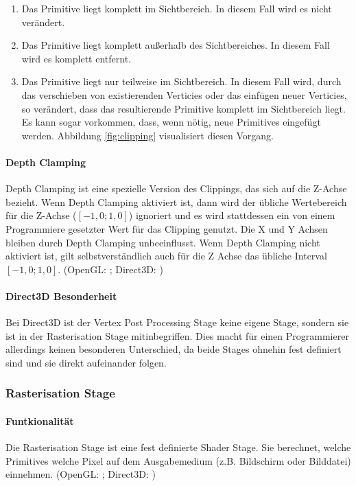 \begin{enumerate}
    \item Das Primitive liegt komplett im Sichtbereich. In diesem Fall wird es nicht verändert.
    \item Das Primitive liegt komplett außerhalb des Sichtbereiches. In diesem Fall wird es komplett entfernt.
    \item Das Primitive liegt nur teilweise im Sichtbereich. In diesem Fall wird, durch das verschieben von existierenden Verticies oder das einfügen neuer Verticies, so verändert, dass das resultierende Primitive komplett im Sichtbereich liegt. Es kann sogar vorkommen, dass, wenn nötig, neue Primitives eingefügt werden. Abbildung \ref{fig:clipping} visualisiert diesen Vorgang.
\end{enumerate}

\paragraph{Depth Clamping}
Depth Clamping ist eine spezielle Version des Clippings, das sich auf die Z-Achse bezieht. Wenn Depth Clamping aktiviert ist, dann wird der übliche Wertebereich für die Z-Achse ($[-1,0;1,0]$) ignoriert und es wird stattdessen ein von einem Programmiere gesetzter Wert für das Clipping genutzt. Die X und Y Achsen bleiben durch Depth Clamping unbeeinflusst. Wenn Depth Clamping nicht aktiviert ist, gilt selbstverständlich auch für die Z Achse das übliche Interval $[-1,0;1,0]$. (OpenGL: \cite{stage_gl_vertex_pp}; Direct3D: \cite{stage_d3d_vertex_pp})

\paragraph{Direct3D Besonderheit}
Bei Direct3D ist der Vertex Post Processing Stage keine eigene Stage, sondern sie ist in der Rasterisation Stage mitinbegriffen. Dies macht für einen Programmierer allerdings keinen besonderen Unterschied, da beide Stages ohnehin fest definiert sind und sie direkt aufeinander folgen.

\subsubsection{Rasterisation Stage}
\paragraph{Funtkionalität}
Die Rasterisation Stage ist eine fest definierte Shader Stage. Sie berechnet, welche Primitives welche Pixel auf dem Ausgabemedium (z.B. Bildschirm oder Bilddatei) einnehmen. (OpenGL: \cite{stage_gl_rasterization}; Direct3D: \cite{stage_d3d_rasterization})

